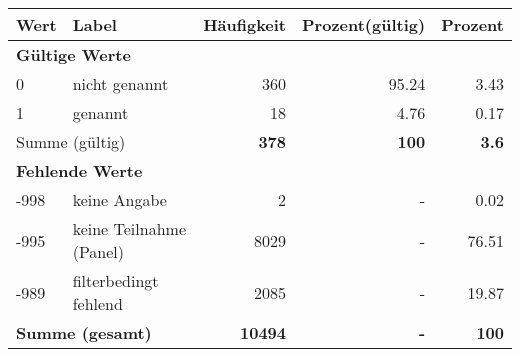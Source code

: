      \begin{longtable}{lXrrr}
     \toprule
     \textbf{Wert} & \textbf{Label} & \textbf{Häufigkeit} & \textbf{Prozent(gültig)} & \textbf{Prozent} \\
     \endhead
     \midrule
     \multicolumn{5}{l}{\textbf{Gültige Werte}}\\

     0 &
     \multicolumn{1}{X}{ nicht genannt   } &


       \num{360} &
       \num[round-mode=places,round-precision=2]{95.24} &
         \num[round-mode=places,round-precision=2]{3.43} \\

     1 &
     \multicolumn{1}{X}{ genannt   } &


       \num{18} &
       \num[round-mode=places,round-precision=2]{4.76} &
         \num[round-mode=places,round-precision=2]{0.17} \\
     \midrule
     \multicolumn{2}{l}{Summe (gültig)} &
       \textbf{\num{378}} &
     \textbf{\num{100}} &
       \textbf{\num[round-mode=places,round-precision=2]{3.6}} \\
     \multicolumn{5}{l}{\textbf{Fehlende Werte}}\\
       -998 &
       keine Angabe &
         \num{2} &
        - &
         \num[round-mode=places,round-precision=2]{0.02} \\
       -995 &
       keine Teilnahme (Panel) &
         \num{8029} &
        - &
         \num[round-mode=places,round-precision=2]{76.51} \\
       -989 &
       filterbedingt fehlend &
         \num{2085} &
        - &
         \num[round-mode=places,round-precision=2]{19.87} \\
     \midrule
     \multicolumn{2}{l}{\textbf{Summe (gesamt)}} &
          \textbf{\num{10494}} &
        \textbf{-} &
        \textbf{\num{100}} \\
     \bottomrule
     \end{longtable}
     

